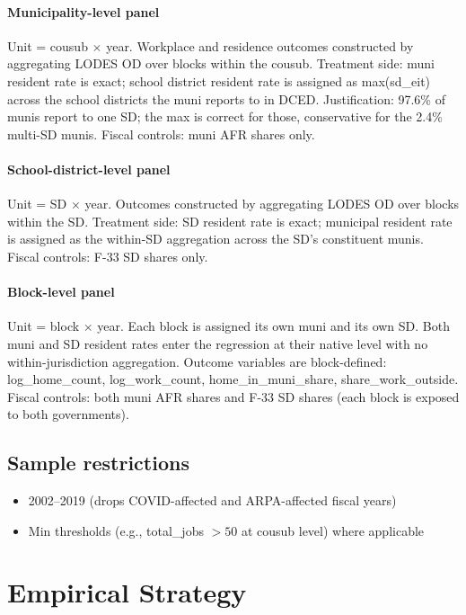 \documentclass{article}
\begin{document}
\paragraph{Municipality-level panel}
Unit = cousub $\times$ year. Workplace and residence outcomes
constructed by aggregating LODES OD over blocks within the cousub.
Treatment side: muni resident rate is exact; school district resident
rate is assigned as max(sd\_eit) across the school districts the muni
reports to in DCED. Justification: 97.6\% of munis report to one SD;
the max is correct for those, conservative for the 2.4\% multi-SD
munis. Fiscal controls: muni AFR shares only.

\paragraph{School-district-level panel}
Unit = SD $\times$ year. Outcomes constructed by aggregating LODES OD
over blocks within the SD. Treatment side: SD resident rate is exact;
municipal resident rate is assigned as the within-SD aggregation across
the SD's constituent munis. Fiscal controls: F-33 SD shares only.

\paragraph{Block-level panel}
Unit = block $\times$ year. Each block is assigned its own muni and its
own SD. Both muni and SD resident rates enter the regression at their
native level with no within-jurisdiction aggregation. Outcome variables
are block-defined: log\_home\_count, log\_work\_count,
home\_in\_muni\_share, share\_work\_outside. Fiscal controls: both muni
AFR shares and F-33 SD shares (each block is exposed to both
governments).

\subsection{Sample restrictions}
\begin{itemize}
  \item 2002--2019 (drops COVID-affected and ARPA-affected fiscal years)
  \item Min thresholds (e.g., total\_jobs $> 50$ at cousub level) where
    applicable
\end{itemize}

\section{Empirical Strategy}
\end{document}
